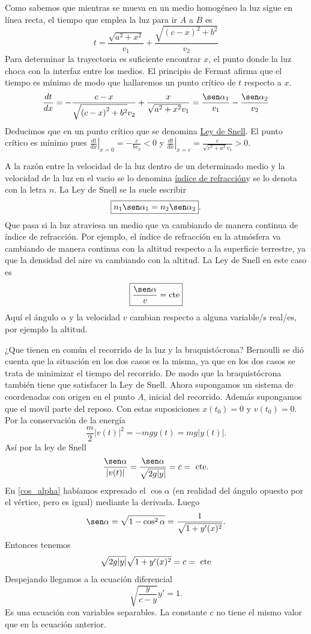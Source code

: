 \begin{subappendices}
Como sabemos que mientras se mueva en un medio homogéneo la luz sigue en línea recta,
el tiempo que emplea la luz para ir $A$ a $B$ es
 \[t=\frac{\sqrt{a^{2} + x^{2}}}{v_{1}} + \frac{\sqrt{{\left(c - x\right)}^{2} + b^{2}}}{v_{2}}\]
Para determinar la trayectoria es suficiente encontrar $x$, el punto donde la luz choca con la interfaz entre los medios.
El principio de Fermat afirma que el tiempo es mínimo de modo que hallaremos un punto crítico de $t$ respecto a $x$.
\[ \frac{dt}{dx}=-\frac{c - x}{\sqrt{{\left(c - x\right)}^{2} + b^{2}} v_{2}} +
\frac{x}{\sqrt{a^{2} + x^{2}} v_{1}}=\frac{\sen\alpha_1}{v_1}-\frac{\sen\alpha_2}{v_2} \]
Deducimos que en un punto crítico
que se denomina \href{http://es.wikipedia.org/wiki/Ley_de_Snell}{Ley de Snell}\link. El punto crítico es mínimo pues $\left.\frac{dt}{dx}\right|_{x=0}=-\tfrac{c}{bv_2}<0$ y
$\left.\frac{dt}{dx}\right|_{x=c}=\tfrac{c}{\sqrt{c^2+a^2}v_1}>0$.

 A la razón entre la velocidad de la luz dentro de un determinado medio y la velocidad de la luz en el vacio se lo denomina
\href{http://es.wikipedia.org/wiki/Índice_de_refracción}{índice de refracción}\link y se lo denota con la letra $n$. La Ley de Snell se la suele escribir
\[\boxed{n_1\sen\alpha_1=n_2\sen\alpha_2 }.\]
Que pasa si la luz atraviesa un medio que va cambiando de manera continua de índice de refracción. Por ejemplo, el índice de refracción en la atmósfera
va cambiando de manera continua con la altitud respecto a la superficie terrestre, ya que la densidad del aire va cambiando con la altitud. La Ley de
Snell en este caso es
\[\boxed{\frac{\sen\alpha}{v}=\text{cte}}\]
Aquí el ángulo $\alpha$ y la velocidad $v$ cambian respecto a alguna variable/s real/es, por ejemplo la altitud.


¿Que tienen en común el recorrido de la luz y la braquistócrona? Bernoulli se dió cuenta que la situación en los dos casos es la misma, ya que en los dos casos
se trata de minimizar el tiempo del recorrido. De modo que la braquistócrona también tiene que satisfacer la Ley de Snell.
 Ahora supongamos un sistema de coordenadas con origen en el punto $A$, inicial del recorrido.  Además supongamos que el movil  parte
del reposo. Con estas suposiciones $x(t_0)=0$ y $v(t_0)=0$. Por la conservación de la energía
\[\frac{m}{2}|v(t)|^2=-mgy(t)=mg|y(t)|.\]
 Así por la ley de Snell
\[\frac{\sen\alpha}{|v(t)|}=\frac{\sen\alpha}{\sqrt{2g|y|}}=c=\text{ cte}.\]
En \eqref{cos_alpha} habíamos expresado el $\cos\alpha$ (en realidad del ángulo opuesto por el vértice, pero es igual) mediante la derivada. Luego
\[\sen\alpha=\sqrt{1-\cos^2\alpha}=\frac{1}{\sqrt{1+y'(x)^2}}.\]
Entonces tenemos
\[\sqrt{2g|y|}\sqrt{1+y'(x)^2}=c=\hbox{ cte}\]
Despejando llegamos a la ecuación diferencial
\[\boxed{\sqrt{\frac{y}{c-y}}y'=1}.\]
Es una ecuación con variables separables. La constante $c$ no tiene el mismo valor que en la ecuación anterior.


\end{subappendices}
